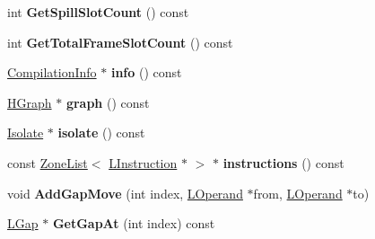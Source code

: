 \begin{DoxyCompactItemize}
\item 
int {\bfseries Get\+Spill\+Slot\+Count} () const \hypertarget{classv8_1_1internal_1_1_l_chunk_a139f3636ea7ae9a4a306403b379e3386}{}\label{classv8_1_1internal_1_1_l_chunk_a139f3636ea7ae9a4a306403b379e3386}

\item 
int {\bfseries Get\+Total\+Frame\+Slot\+Count} () const \hypertarget{classv8_1_1internal_1_1_l_chunk_a6cd7166ff9d6a6a869c4ec35322435af}{}\label{classv8_1_1internal_1_1_l_chunk_a6cd7166ff9d6a6a869c4ec35322435af}

\item 
\hyperlink{classv8_1_1internal_1_1_compilation_info}{Compilation\+Info} $\ast$ {\bfseries info} () const \hypertarget{classv8_1_1internal_1_1_l_chunk_ad308e7305ebb06e07c7f2c87ad68e533}{}\label{classv8_1_1internal_1_1_l_chunk_ad308e7305ebb06e07c7f2c87ad68e533}

\item 
\hyperlink{classv8_1_1internal_1_1_h_graph}{H\+Graph} $\ast$ {\bfseries graph} () const \hypertarget{classv8_1_1internal_1_1_l_chunk_ae8674654339884a937f946368fc8e857}{}\label{classv8_1_1internal_1_1_l_chunk_ae8674654339884a937f946368fc8e857}

\item 
\hyperlink{classv8_1_1internal_1_1_isolate}{Isolate} $\ast$ {\bfseries isolate} () const \hypertarget{classv8_1_1internal_1_1_l_chunk_ab193d1964b055f425c9d8fe027cfa9c4}{}\label{classv8_1_1internal_1_1_l_chunk_ab193d1964b055f425c9d8fe027cfa9c4}

\item 
const \hyperlink{classv8_1_1internal_1_1_zone_list}{Zone\+List}$<$ \hyperlink{classv8_1_1internal_1_1_l_instruction}{L\+Instruction} $\ast$ $>$ $\ast$ {\bfseries instructions} () const \hypertarget{classv8_1_1internal_1_1_l_chunk_ac961c57b99959c05913e423b1981538b}{}\label{classv8_1_1internal_1_1_l_chunk_ac961c57b99959c05913e423b1981538b}

\item 
void {\bfseries Add\+Gap\+Move} (int index, \hyperlink{classv8_1_1internal_1_1_l_operand}{L\+Operand} $\ast$from, \hyperlink{classv8_1_1internal_1_1_l_operand}{L\+Operand} $\ast$to)\hypertarget{classv8_1_1internal_1_1_l_chunk_a72ba50bf248b10c56901b11f84b9aad4}{}\label{classv8_1_1internal_1_1_l_chunk_a72ba50bf248b10c56901b11f84b9aad4}

\item 
\hyperlink{classv8_1_1internal_1_1_l_gap}{L\+Gap} $\ast$ {\bfseries Get\+Gap\+At} (int index) const \hypertarget{classv8_1_1internal_1_1_l_chunk_ae9bc08f7558ac509895967f50c0697f3}{}\label{classv8_1_1internal_1_1_l_chunk_ae9bc08f7558ac509895967f50c0697f3}


\end{DoxyCompactItemize}
